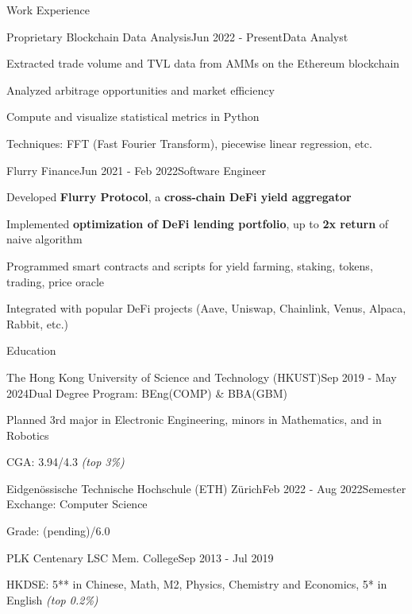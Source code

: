 \documentclass{resume}
\begin{document}
\begin{rSection}{Work Experience}
    
    \begin{rSubsection}{Proprietary Blockchain Data Analysis}{Jun 2022 - Present}{Data Analyst}{}
        \item Extracted trade volume and TVL data from AMMs on the Ethereum blockchain
        \item Analyzed arbitrage opportunities and market efficiency
        \item Compute and visualize statistical metrics in Python
        \item Techniques: FFT (Fast Fourier Transform), piecewise linear regression, etc.
    \end{rSubsection}
    
    \begin{rSubsection}{Flurry Finance}{Jun 2021 - Feb 2022}{Software Engineer}{}
        \item Developed \textbf{Flurry Protocol}, a \textbf{cross-chain DeFi yield aggregator}
        \item Implemented \textbf{optimization of DeFi lending portfolio}, up to \textbf{2x return} of naive algorithm
        \item Programmed smart contracts and scripts for yield farming, staking, tokens, trading, price oracle
        \item Integrated with popular DeFi projects (Aave, Uniswap, Chainlink, Venus, Alpaca, Rabbit, etc.)
    \end{rSubsection}
    
\end{rSection}

\begin{rSection}{Education}

    \begin{rSubsection}{The Hong Kong University of Science and Technology (HKUST)}{Sep 2019 - May 2024}{Dual Degree Program: BEng(COMP) \& BBA(GBM)}{}
        \item Planned 3rd major in Electronic Engineering, minors in Mathematics, and in Robotics
        \item CGA: 3.94/4.3 \emph{(top 3\%)}
    \end{rSubsection}

    \begin{rSubsection}{Eidgenössische Technische Hochschule (ETH) Zürich}{Feb 2022 - Aug 2022}{Semester Exchange: Computer Science}{}
        \item Grade: (pending)/6.0
    \end{rSubsection}

    \begin{rSubsection}{PLK Centenary LSC Mem. College}{Sep 2013 - Jul 2019}{}{}
        \item HKDSE: 5** in Chinese, Math, M2, Physics, Chemistry and Economics, 5* in English \emph{(top 0.2\%)}
    \end{rSubsection}

\end{rSection}
\end{document}
